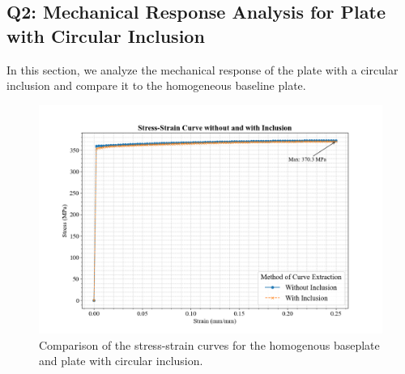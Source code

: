 \documentclass[12pt]{article}
\begin{document}
\subsection*{Q2: Mechanical Response Analysis for Plate with Circular Inclusion}

In this section, we analyze the mechanical response of the plate with a circular inclusion and compare it to the homogeneous baseline plate.

\begin{figure}[H]
    \centering
    \includegraphics[width=1\textwidth]{visualize_tensileGraph/res/comparison_inclusion_non.png}
    \caption{Comparison of the stress-strain curves for the homogenous baseplate and plate with circular
    inclusion.}
    \label{fig:ComparisonInclusion}
\end{figure}
\end{document}
